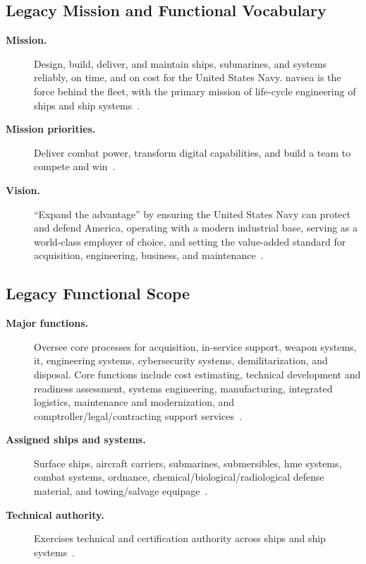 \documentclass[../main.tex]{subfiles}
\begin{document}
\subsection{Legacy Mission and Functional Vocabulary}
\begin{description}
  \item[\textbf{Mission.}] Design, build, deliver, and maintain ships, submarines, and systems reliably, on time, and on cost for the United States Navy. \ac{navsea} is the force behind the fleet, with the primary mission of life-cycle engineering of ships and ship systems~\autocite{edo-2-1-2-navsea-organization-2025}.
  \item[\textbf{Mission priorities.}] Deliver combat power, transform digital capabilities, and build a team to compete and win~\autocite{edo-2-1-2-navsea-organization-2025}.
  \item[\textbf{Vision.}] ``Expand the advantage'' by ensuring the United States Navy can protect and defend America, operating with a modern industrial base, serving as a world-class employer of choice, and setting the value-added standard for acquisition, engineering, business, and maintenance~\autocite{edo-2-1-2-navsea-organization-2025}.
\end{description}

\subsection{Legacy Functional Scope}
\begin{description}
  \item[\textbf{Major functions.}] Oversee core processes for acquisition, in-service support, weapon systems, \ac{it}, engineering systems, cybersecurity systems, demilitarization, and disposal. Core functions include cost estimating, technical development and readiness assessment, systems engineering, manufacturing, integrated logistics, maintenance and modernization, and comptroller/legal/contracting support services~\autocite{edo-2-1-2-navsea-organization-2025}.
  \item[\textbf{Assigned ships and systems.}] Surface ships, aircraft carriers, submarines, submersibles, \ac{hme} systems, combat systems, ordnance, chemical/biological/radiological defense material, and towing/salvage equipage~\autocite{edo-2-1-2-navsea-organization-2025}.
  \item[\textbf{Technical authority.}] Exercises technical and certification authority across ships and ship systems~\autocite{edo-2-1-2-navsea-organization-2025}.
\end{description}
\end{document}
